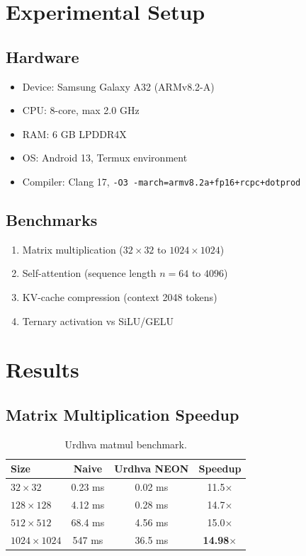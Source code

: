 \documentclass[12pt, a4paper]{article}
\begin{document}
\section{Experimental Setup}

\subsection{Hardware}
\begin{itemize}
    \item Device: Samsung Galaxy A32 (ARMv8.2-A)
    \item CPU: 8-core, max 2.0 GHz
    \item RAM: 6 GB LPDDR4X
    \item OS: Android 13, Termux environment
    \item Compiler: Clang 17, \texttt{-O3 -march=armv8.2a+fp16+rcpc+dotprod}
\end{itemize}

\subsection{Benchmarks}
\begin{enumerate}
    \item Matrix multiplication ($32\times32$ to $1024\times1024$)
    \item Self-attention (sequence length $n=64$ to $4096$)
    \item KV-cache compression (context 2048 tokens)
    \item Ternary activation vs SiLU/GELU
\end{enumerate}

\section{Results}

\subsection{Matrix Multiplication Speedup}
\begin{table}[h]
\centering
\begin{tabular}{lccc}
\toprule
\textbf{Size} & \textbf{Naive} & \textbf{Urdhva NEON} & \textbf{Speedup} \\
\midrule
$32\times32$ & 0.23 ms & 0.02 ms & 11.5$\times$ \\
$128\times128$ & 4.12 ms & 0.28 ms & 14.7$\times$ \\
$512\times512$ & 68.4 ms & 4.56 ms & 15.0$\times$ \\
$1024\times1024$ & 547 ms & 36.5 ms & \textbf{14.98$\times$} \\
\bottomrule
\end{tabular}
\caption{Urdhva matmul benchmark.}
\end{table}
\end{document}
